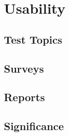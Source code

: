 \chapter{Usability}
\label{chap:usability}

\section{Test Topics}

\section{Surveys}

\section{Reports}

\section{Significance}